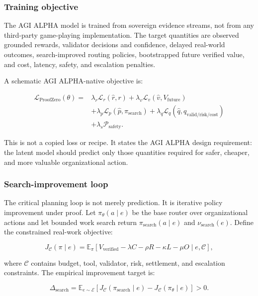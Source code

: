 \subsubsection{Training objective}\label{training-objective}

The AGI ALPHA model is trained from sovereign evidence streams, not from
any third-party game-playing implementation. The target quantities are
observed grounded rewards, validator decisions and confidence, delayed
real-world outcomes, search-improved routing policies, bootstrapped
future verified value, and cost, latency, safety, and escalation
penalties.

A schematic AGI ALPHA-native objective is:

\[
\begin{aligned}
\mathcal{L}_{\mathrm{ProofZero}}(\theta)={}&
\lambda_r\mathcal{L}_r(\hat r,r)
+\lambda_v\mathcal{L}_v(\hat v,V_{\mathrm{future}})\\
&+\lambda_p\mathcal{L}_p(\hat p,\pi_{\mathrm{search}})
+\lambda_q\mathcal{L}_q(\hat q,q_{\mathrm{valid/risk/cost}})\\
&+\lambda_s\mathcal{P}_{\mathrm{safety}}.
\end{aligned}
\]

This is not a copied loss or recipe. It states the AGI ALPHA design
requirement: the latent model should predict only those quantities
required for safer, cheaper, and more valuable organizational action.

\subsubsection{Search-improvement loop}\label{search-improvement-loop}

The critical planning loop is not merely prediction. It is iterative
policy improvement under proof. Let \(\pi_\theta(a\mid e)\) be the base
router over organizational actions and let bounded work search return
\(\pi_{\mathrm{search}}(a\mid e)\) and \(\nu_{\mathrm{search}}(e)\).
Define the constrained real-work objective:

\[
J_{\mathcal{C}}(\pi\mid e)=\mathbb{E}_{\pi}\left[V_{\mathrm{verified}}-\lambda C-\rho R-\kappa L-\mu O\mid e,\mathcal{C}\right],
\]

where \(\mathcal{C}\) contains budget, tool, validator, risk,
settlement, and escalation constraints. The empirical improvement target
is:

\[
\Delta_{\mathrm{search}} = \mathbb{E}_{e\sim \mathcal{E}}\left[J_{\mathcal{C}}(\pi_{\mathrm{search}}\mid e)-J_{\mathcal{C}}(\pi_\theta\mid e)\right] > 0.
\]


